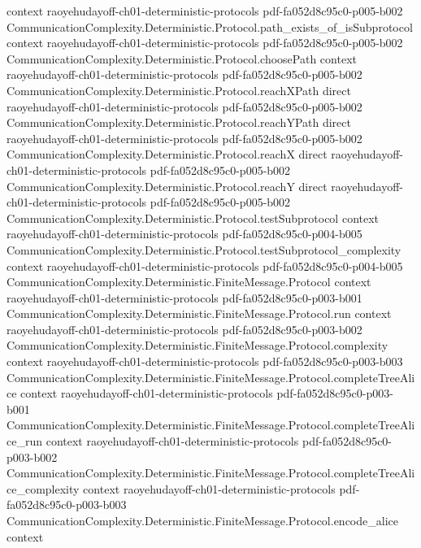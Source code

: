 \begin{theorem}
  {context}
  {raoyehudayoff-ch01-deterministic-protocols}
  {pdf-fa052d8c95c0-p005-b002}
\proofstep
  {CommunicationComplexity.Deterministic.Protocol.path_exists_of_isSubprotocol}
  {context}
  {raoyehudayoff-ch01-deterministic-protocols}
  {pdf-fa052d8c95c0-p005-b002}
\proofstep
  {CommunicationComplexity.Deterministic.Protocol.choosePath}
  {context}
  {raoyehudayoff-ch01-deterministic-protocols}
  {pdf-fa052d8c95c0-p005-b002}
\proofstep
  {CommunicationComplexity.Deterministic.Protocol.reachXPath}
  {direct}
  {raoyehudayoff-ch01-deterministic-protocols}
  {pdf-fa052d8c95c0-p005-b002}
\proofstep
  {CommunicationComplexity.Deterministic.Protocol.reachYPath}
  {direct}
  {raoyehudayoff-ch01-deterministic-protocols}
  {pdf-fa052d8c95c0-p005-b002}
\proofstep
  {CommunicationComplexity.Deterministic.Protocol.reachX}
  {direct}
  {raoyehudayoff-ch01-deterministic-protocols}
  {pdf-fa052d8c95c0-p005-b002}
\proofstep
  {CommunicationComplexity.Deterministic.Protocol.reachY}
  {direct}
  {raoyehudayoff-ch01-deterministic-protocols}
  {pdf-fa052d8c95c0-p005-b002}
\proofstep
  {CommunicationComplexity.Deterministic.Protocol.testSubprotocol}
  {context}
  {raoyehudayoff-ch01-deterministic-protocols}
  {pdf-fa052d8c95c0-p004-b005}
\proofstep
  {CommunicationComplexity.Deterministic.Protocol.testSubprotocol_complexity}
  {context}
  {raoyehudayoff-ch01-deterministic-protocols}
  {pdf-fa052d8c95c0-p004-b005}
\proofstep
  {CommunicationComplexity.Deterministic.FiniteMessage.Protocol}
  {context}
  {raoyehudayoff-ch01-deterministic-protocols}
  {pdf-fa052d8c95c0-p003-b001}
\proofstep
  {CommunicationComplexity.Deterministic.FiniteMessage.Protocol.run}
  {context}
  {raoyehudayoff-ch01-deterministic-protocols}
  {pdf-fa052d8c95c0-p003-b002}
\proofstep
  {CommunicationComplexity.Deterministic.FiniteMessage.Protocol.complexity}
  {context}
  {raoyehudayoff-ch01-deterministic-protocols}
  {pdf-fa052d8c95c0-p003-b003}
\proofstep
  {CommunicationComplexity.Deterministic.FiniteMessage.Protocol.completeTreeAlice}
  {context}
  {raoyehudayoff-ch01-deterministic-protocols}
  {pdf-fa052d8c95c0-p003-b001}
\proofstep
  {CommunicationComplexity.Deterministic.FiniteMessage.Protocol.completeTreeAlice_run}
  {context}
  {raoyehudayoff-ch01-deterministic-protocols}
  {pdf-fa052d8c95c0-p003-b002}
\proofstep
  {CommunicationComplexity.Deterministic.FiniteMessage.Protocol.completeTreeAlice_complexity}
  {context}
  {raoyehudayoff-ch01-deterministic-protocols}
  {pdf-fa052d8c95c0-p003-b003}
\proofstep
  {CommunicationComplexity.Deterministic.FiniteMessage.Protocol.encode_alice}
  {context}

\end{theorem}
